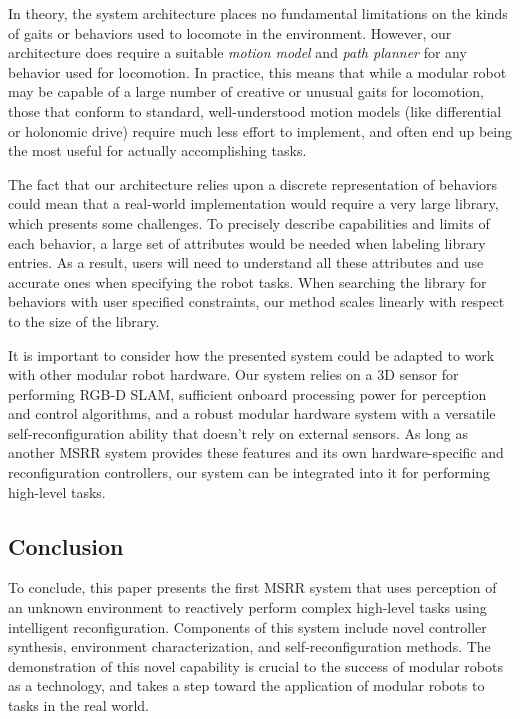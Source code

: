 \documentclass[journal]{IEEEtran}
\begin{document}
In theory, the system architecture places no fundamental limitations on the kinds of gaits or behaviors used to locomote in the environment.  However, our architecture does require a suitable \textit{motion model} and \textit{path planner} for any behavior used for locomotion.  In practice, this means that while a modular robot may be capable of a large number of creative or unusual gaits for locomotion, those that conform to standard, well-understood motion models (like differential or holonomic drive) require much less effort to implement, and often end up being the most useful for actually accomplishing tasks.

The fact that our architecture relies upon a discrete representation of behaviors could mean that a real-world implementation would require a very large library, which presents some challenges. To precisely describe capabilities and limits of each behavior, a large set of attributes would be needed when labeling library entries. As a result, users will need to understand all these attributes and use accurate ones when specifying the robot tasks. 
When searching the library for behaviors with user specified constraints, our method scales linearly with respect to the size of the library.%

It is important to consider how the presented system could be adapted to work with
other modular robot hardware. Our system relies on a 3D sensor for performing RGB-D
SLAM, sufficient onboard processing power for perception and control algorithms,
and a robust modular hardware system with a versatile self-reconfiguration ability
that doesn't rely on external sensors. As long as another MSRR system provides these
features and its own hardware-specific and reconfiguration controllers, our system
can be integrated into it for performing high-level tasks.
%
\subsection{Conclusion}
%
To conclude, this paper presents the first MSRR system that uses perception of an unknown environment to reactively perform complex high-level tasks using intelligent reconfiguration. Components of this system include novel controller synthesis, environment characterization, and self-reconfiguration methods. The demonstration of this novel capability is crucial to the success of modular robots as a technology, and takes a step toward the application of modular robots to tasks in the real world.
%
%
\end{document}
